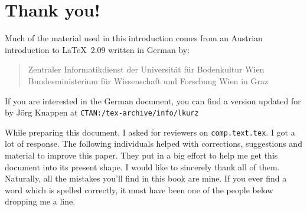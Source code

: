 \chapter{Thank you!}
\noindent Much of the material used in this introduction comes from an
Austrian introduction to \LaTeX\ 2.09 written in German by:
\begin{verse}
%
{Zentraler Informatikdienst der Universit\"at f\"ur Bodenkultur Wien}
%
   {Bundesministerium f\"ur Wissenschaft und Forschung Wien}
%
   {in Graz}
\end{verse}

If you are interested in the German document, you can find a version
updated for \LaTeXe{} by J\"org Knappen at
\texttt{CTAN:/tex-archive/info/lkurz}

\noindent While preparing this document, I asked
for reviewers on \texttt{comp.text.tex}. I got a lot of response. The
following individuals helped with corrections, suggestions and
material to improve this paper. They put in a big effort to help me
get this document into its present shape. I would like to
sincerely thank all of them. Naturally, all the mistakes you'll find
in this book are mine. If you ever find a word which is spelled
correctly, it must have been one of the people below dropping me a
line.


